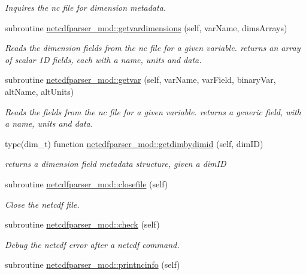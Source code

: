 \begin{DoxyCompactItemize}
\begin{DoxyCompactList}\small\item\em Inquires the nc file for dimension metadata. \end{DoxyCompactList}\item 
subroutine \mbox{\hyperlink{namespacenetcdfparser__mod_a0aea819b8a474ce2f4840d0bc44e95ec}{netcdfparser\+\_\+mod\+::getvardimensions}} (self, var\+Name, dims\+Arrays)
\begin{DoxyCompactList}\small\item\em Reads the dimension fields from the nc file for a given variable. returns an array of scalar 1D fields, each with a name, units and data. \end{DoxyCompactList}\item 
subroutine \mbox{\hyperlink{namespacenetcdfparser__mod_aba877869db6bea7262d659133253cff7}{netcdfparser\+\_\+mod\+::getvar}} (self, var\+Name, var\+Field, binary\+Var, alt\+Name, alt\+Units)
\begin{DoxyCompactList}\small\item\em Reads the fields from the nc file for a given variable. returns a generic field, with a name, units and data. \end{DoxyCompactList}\item 
type(dim\+\_\+t) function \mbox{\hyperlink{namespacenetcdfparser__mod_a5fcd4b7fb27dbc9befd0a6fcfb9929a1}{netcdfparser\+\_\+mod\+::getdimbydimid}} (self, dim\+ID)
\begin{DoxyCompactList}\small\item\em returns a dimension field metadata structure, given a dim\+ID \end{DoxyCompactList}\item 
subroutine \mbox{\hyperlink{namespacenetcdfparser__mod_a518627511cac4bf3dbc338bf3bfd5e24}{netcdfparser\+\_\+mod\+::closefile}} (self)
\begin{DoxyCompactList}\small\item\em Close the netcdf file. \end{DoxyCompactList}\item 
subroutine \mbox{\hyperlink{namespacenetcdfparser__mod_ae1a034f6540ac7a1ce7d0e3831bb2f03}{netcdfparser\+\_\+mod\+::check}} (self)
\begin{DoxyCompactList}\small\item\em Debug the netcdf error after a netcdf command. \end{DoxyCompactList}\item 
subroutine \mbox{\hyperlink{namespacenetcdfparser__mod_aeb48d33c014bae21b2fceaaa70cbdc67}{netcdfparser\+\_\+mod\+::printncinfo}} (self)

\end{DoxyCompactItemize}
